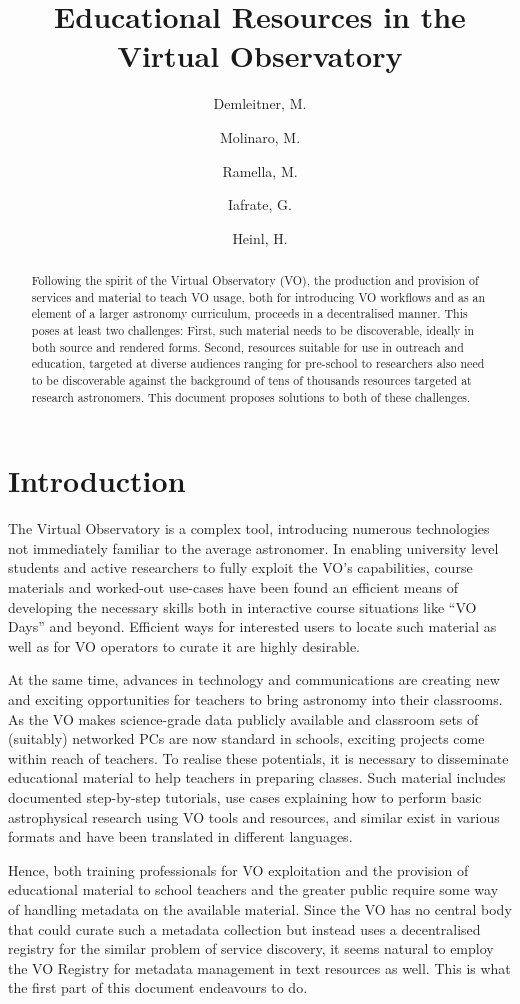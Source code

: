\documentclass{ivoa}
\author{Demleitner, M.}
\author{Molinaro, M.}
\author{Ramella, M.}
\author{Iafrate, G.}
\author{Heinl, H.}
\title{Educational Resources in the Virtual Observatory}
\begin{document}
\begin{abstract}
Following the spirit of the Virtual Observatory (VO), the production and
provision of services and material to teach VO usage, both for
introducing VO workflows and as an element of a larger astronomy
curriculum, proceeds in a decentralised manner.  This poses at least two
challenges: First, such material needs to be discoverable, ideally in
both source and rendered forms.  Second, resources suitable for use in
outreach and education, targeted at diverse audiences ranging for
pre-school to researchers also need to be discoverable against the
background of tens of thousands resources targeted at research
astronomers.  This document proposes solutions to both of these
challenges.
\end{abstract}


\section{Introduction}

The Virtual Observatory is a complex tool, introducing numerous
technologies not immediately familiar to the average astronomer.
In enabling university level students
and active researchers to fully exploit the VO's capabilities, course
materials and worked-out use-cases have been found an efficient means of
developing the necessary skills both in interactive course situations
like ``VO Days'' and beyond.  
Efficient ways for interested users to locate such
material as well as for VO operators to curate it are highly desirable.

At the same time, advances in technology and 
communications are creating new and exciting 
opportunities for teachers to bring astronomy into their 
classrooms.  As the VO makes science-grade data publicly available and
classroom sets of (suitably) networked PCs are now standard in schools,
exciting projects come within reach of teachers.  To realise these
potentials,
it is necessary to disseminate educational material to help teachers
in preparing classes.  Such material includes documented step-by-step
tutorials, use cases explaining how to perform basic astrophysical research 
using VO tools and resources, and similar exist in various formats and
have been translated in different languages.

Hence, both training professionals for VO exploitation and the provision
of educational material to school teachers and the greater public
require some way of handling metadata on the available material.  Since
the VO has no central body that could curate such a metadata collection
but instead uses a decentralised registry for the similar problem of
service discovery, it seems natural to employ the VO Registry for
metadata management in text resources as well.  This is what the first
part of this document endeavours to do.
\end{document}
